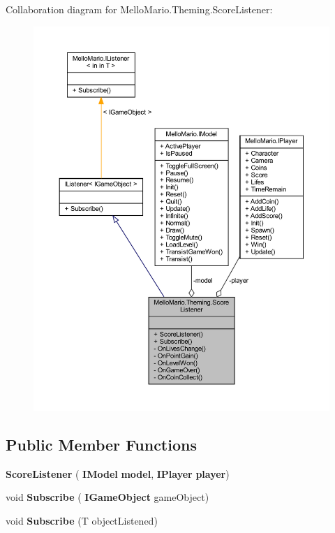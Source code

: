Collaboration diagram for Mello\+Mario.\+Theming.\+Score\+Listener\+:
\nopagebreak
\begin{figure}[H]
\begin{center}
\leavevmode
\includegraphics[width=350pt]{classMelloMario_1_1Theming_1_1ScoreListener__coll__graph}
\end{center}
\end{figure}
\subsection*{Public Member Functions}
\begin{DoxyCompactItemize}
\item 
\textbf{ Score\+Listener} (\textbf{ I\+Model} \textbf{ model}, \textbf{ I\+Player} \textbf{ player})
\item 
void \textbf{ Subscribe} (\textbf{ I\+Game\+Object} game\+Object)
\item 
void \textbf{ Subscribe} (T object\+Listened)
\end{DoxyCompactItemize}
